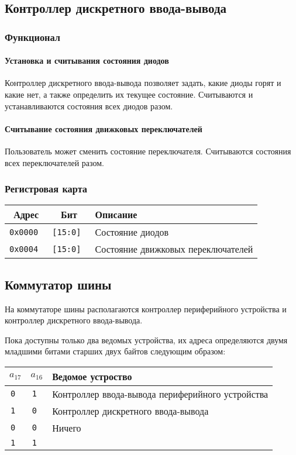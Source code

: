 \documentclass[12pt, a4paper] {ncc}
\begin{document}
\subsection{Контроллер дискретного ввода-вывода}

\subsubsection{Функционал}

\paragraph{Установка и считывания состояния диодов} Контроллер дискретного
ввода-вывода позволяет задать, какие диоды горят и какие нет, а также
определить их текущее состояние. Считываются и устанавливаются состояния всех
диодов разом.

\paragraph{Считывание состояния движковых переключателей} Пользователь может
сменить состояние переключателя. Считываются состояния всех переключателей
разом.

\subsubsection{Регистровая карта}

\begin{tabular}{|c|c|l|}
        \hline
        \bf Адрес & \bf Бит & \bf Описание \\
        \hline
        \tt 0x0000 & \tt [15:0] & Состояние диодов \\
        \hline
        \tt 0x0004 & \tt [15:0] & Состояние движковых переключателей \\
        \hline
\end{tabular}

\subsection{Коммутатор шины}

На коммутаторе шины располагаются контроллер периферийного устройства и
контроллер дискретного ввода-вывода.

Пока доступны только два ведомых устройства, их адреса определяются двумя
младшими битами старших двух байтов следующим образом:

\begin{tabular}{|c|c|l|}
        \hline
        $a_{17}$ & $a_{16}$ & Ведомое устроство \\
        \hline
        \tt 0 & \tt 1 & Контроллер ввода-вывода периферийного устройства \\
        \hline
        \tt 1 & \tt 0 & Контроллер дискретного ввода-вывода \\
        \hline
        \tt 0 & \tt 0 & Ничего \\
        \cline{1-2}
        \tt 1 & \tt 1 & \\
        \hline
\end{tabular}
\end{document}
